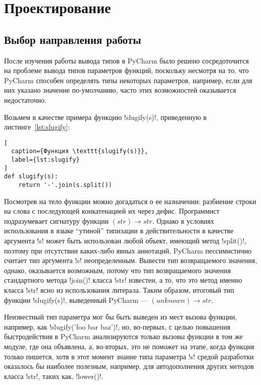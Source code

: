 \chapter{Проектирование}
\label{sec:designing}

\section{Выбор направления работы}
\label{sec:work-direction}

После изучения работы вывода типов в PyCharm было решено сосредоточится на
проблеме вывода типов параметров функций, поскольку несмотря на то, что PyCharm
способен определять типы некоторых параметров, например, если для них указано
значение по-умолчанию, часто этих возможностей оказывается недостаточно.

Возьмем в качестве примера функцию !slugify(s)!, приведенную в
листинге~\ref{lst:slugify}:

\begin{lstlisting}[
  caption={Функция \texttt{slugify(s)}},
  label={lst:slugify}
]
def slugify(s):
    return '-'.join(s.split())
\end{lstlisting}

Посмотрев на тело функции можно догадаться о ее назначении: разбиение строки на
слова с последующей конкатенацией их через дефис. Программист подразумевает
сигнатуру функции $(str) \rightarrow str$. Однако в условиях использования в языке
``утиной'' типизации в действительности в качестве аргумента !s! может быть использован
любой объект, имеющий метод !split()!, поэтому при отсутствии каких-либо явных
аннотаций, PyCharm пессимистично считает тип аргумента !s!  неопределенным.
Вывести тип возвращаемого значения, однако, оказывается возможным, потому что тип
возвращаемого значения стандартного метода !join()! класса !str! известен, а то,
что это метод именно класса !str! ясно из использования литерала.
Таким образом, итоговый тип функции !slugify(s)!, выведенный PyCharm ---
$(unknown) \rightarrow str$.

Неизвестный тип параметра мог бы быть выведен из мест вызова функции, например, 
как !slugify('foo bar baz')!, но, во-первых, с целью повышения быстродействия в
PyCharm анализируются только вызовы функции в том же модуле, где она объявлена,
а, во-вторых, это не поможет на этапе, когда функция только пишется, хотя
в этот момент знание типа параметра !s! средой разработки оказалось бы наиболее
полезным, например, для автодополнения других методов класса !str!, таких как,
!lower()!.

